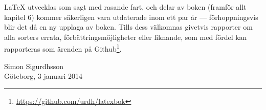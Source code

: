 \documentclass[10pt,../../a4.tex]{subfiles}
\begin{document}
\LaTeX{} utvecklas som sagt med rasande fart, och delar av boken (framför
allt kapitel 6) kommer säkerligen vara utdaterade inom ett par år — förhoppningsvis blir det då en ny upplaga av boken. Tills dess välkomnas
givetvis rapporter om alla sorters errata, förbättringsmöjligheter eller
liknande, som med fördel kan rapporteras som ärenden på Github\footnote{\url{https://github.com/urdh/latexbok}}.

\medskip
\noindent
Simon Sigurdhsson\\
Göteborg, 3 januari 2014
\end{document}
